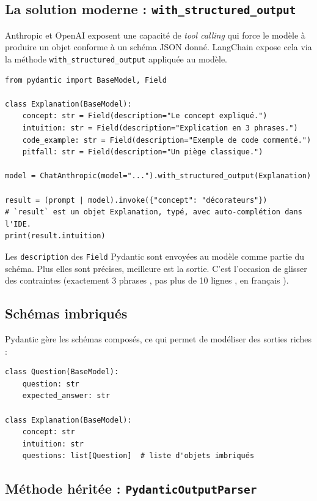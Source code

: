 \documentclass[11pt,a4paper]{article}
\begin{document}
\subsection{La solution moderne : \texttt{with\_structured\_output}}

Anthropic et OpenAI exposent une capacité de \emph{tool calling} qui force le modèle à produire un objet conforme à un schéma JSON donné. LangChain expose cela via la méthode \texttt{with\_structured\_output} appliquée au modèle.

\begin{verbatim}
from pydantic import BaseModel, Field

class Explanation(BaseModel):
    concept: str = Field(description="Le concept expliqué.")
    intuition: str = Field(description="Explication en 3 phrases.")
    code_example: str = Field(description="Exemple de code commenté.")
    pitfall: str = Field(description="Un piège classique.")

model = ChatAnthropic(model="...").with_structured_output(Explanation)

result = (prompt | model).invoke({"concept": "décorateurs"})
# `result` est un objet Explanation, typé, avec auto-complétion dans l'IDE.
print(result.intuition)
\end{verbatim}

\begin{info}
Les \texttt{description} des \texttt{Field} Pydantic sont envoyées au modèle comme partie du schéma. Plus elles sont précises, meilleure est la sortie. C'est l'occasion de glisser des contraintes (\og exactement 3 phrases \fg, \og pas plus de 10 lignes \fg, \og en français \fg).
\end{info}

\subsection{Schémas imbriqués}

Pydantic gère les schémas composés, ce qui permet de modéliser des sorties riches :

\begin{verbatim}
class Question(BaseModel):
    question: str
    expected_answer: str

class Explanation(BaseModel):
    concept: str
    intuition: str
    questions: list[Question]  # liste d'objets imbriqués
\end{verbatim}

\subsection{Méthode héritée : \texttt{PydanticOutputParser}}
\end{document}
